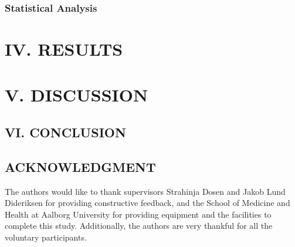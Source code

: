 \begin{multicols}{2}
	\subsubsection*{Statistical Analysis}
	
	\section*{IV. RESULTS}%
	
	
	\section*{V. DISCUSSION}%
	
	
	\subsection*{VI. CONCLUSION}%
	
%	
	
	
	
	\subsection*{ACKNOWLEDGMENT}
	
	The authors would like to thank supervisors Strahinja Dosen and Jakob Lund Dideriksen for providing constructive feedback, and the School of Medicine and Health at Aalborg University for providing equipment and the facilities to complete this study. Additionally, the authors are very thankful for all the voluntary participants. 


\renewcommand*{\bibfont}{\small}
	\printbibliography
	

	

\end{multicols}
